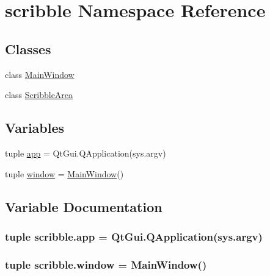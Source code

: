\hypertarget{namespacescribble}{}\section{scribble Namespace Reference}
\label{namespacescribble}
\subsection*{Classes}
\begin{DoxyCompactItemize}
\item 
class \hyperlink{classscribble_1_1MainWindow}{Main\+Window}
\item 
class \hyperlink{classscribble_1_1ScribbleArea}{Scribble\+Area}
\end{DoxyCompactItemize}
\subsection*{Variables}
\begin{DoxyCompactItemize}
\item 
tuple \hyperlink{namespacescribble_a956fd04424c63d07b17141c9abe7cbda}{app} = Qt\+Gui.\+Q\+Application(sys.\+argv)
\item 
tuple \hyperlink{namespacescribble_adde3bc39341716abd057030de876be56}{window} = \hyperlink{classscribble_1_1MainWindow}{Main\+Window}()
\end{DoxyCompactItemize}


\subsection{Variable Documentation}
\hypertarget{namespacescribble_a956fd04424c63d07b17141c9abe7cbda}{}
\subsubsection[{app}]{\setlength{\rightskip}{0pt plus 5cm}tuple scribble.\+app = Qt\+Gui.\+Q\+Application(sys.\+argv)}\label{namespacescribble_a956fd04424c63d07b17141c9abe7cbda}
\hypertarget{namespacescribble_adde3bc39341716abd057030de876be56}{}
\subsubsection[{window}]{\setlength{\rightskip}{0pt plus 5cm}tuple scribble.\+window = {\bf Main\+Window}()}\label{namespacescribble_adde3bc39341716abd057030de876be56}
